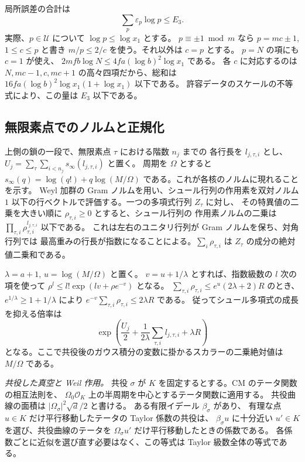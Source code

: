 局所誤差の合計は
\begin{equation}\label{eq:upper-error-sum}
  \sum_p \varepsilon_p\log p\le E_3.
\end{equation}
実際、\(p\in\mathcal U\) について \(\log p\le\log x_1\) とする。
\(p\equiv\pm1\bmod m\) なら \(p=mc\pm1\), \(1\le c\le p\) と書き
\(m/p\le2/c\) を使う。それ以外は \(c=p\) とする。
\(p=N\) の項にも \(c=1\) が使え、
\(2mfb\log N\le4fa(\log b)^2\log x_1\) である。
各 \(c\) に対応するのは \(N,mc-1,c,mc+1\) の高々四項だから、総和は
\(16fa(\log b)^2\log x_1(1+\log x_1)\) 以下である。
許容データのスケールの不等式により、この量は \(E_3\) 以下である。

\subsection{無限素点でのノルムと正規化}

上側の鎖の一段で、無限素点 \(\tau\) における階数 \(n_j\) までの
各行長を \(l_{j,\tau,i}\) とし、
\(U_j=\sum_{\tau}\sum_{i<n_j}s_\infty(l_{j,\tau,i})\) と置く。
周期を \(\Omega\) とすると \(s_\infty(q)=\log(q!)+q\log(M/\Omega)\)
である。これが各核のノルムに現れることを示す。
Weyl 加群の Gram ノルムを用い、シュール行列の作用素を双対ノルム
\(1\) 以下の行ベクトルで評価する。一つの多項式行列 \(Z_\tau\) に対し、
その特異値の二乗を大きい順に \(\rho_{\tau,i}\ge0\) とすると、シュール行列の
作用素ノルムの二乗は \(\prod_{\tau,i}\rho_{\tau,i}^{l_{j,\tau,i}}\) 以下である。
これは左右のユニタリ行列が Gram ノルムを保ち、対角行列では
最高重みの行長が指数になることによる。\(\sum_i\rho_{\tau,i}\) は
\(Z_\tau\) の成分の絶対値二乗和である。

\(\lambda=a+1\), \(u=\log(M/\Omega)\) と置く。
\(v=u+1/\lambda\) とすれば、指数級数の \(l\) 次の項を使って
\(\rho^l\le l!\exp(lv+\rho e^{-v})\) となる。
\(\sum_{\tau,i}\rho_{\tau,i}\le e^u(2\lambda+2)R\) のとき、
\(e^{1/\lambda}\ge1+1/\lambda\) により
\(e^{-v}\sum_{\tau,i}\rho_{\tau,i}\le2\lambda R\) である。
従ってシュール多項式の成長を抑える倍率は
\[
 \exp\!\left(\frac{U_j}{2}
       +\frac1{2\lambda}\sum_{\tau,i}l_{j,\tau,i}+\lambda R\right)
\]
となる。ここで共役後のガウス積分の変数に掛かるスカラーの二乗絶対値は
\(M/\Omega\) である。

\emph{共役した真空と Weil 作用。}
共役 \(\sigma\) が \(K\) を固定するとする。CM のテータ関数の相互法則を、
\(\Omega_0\mathcal O_K\) 上の半周期を中心とするテータ関数に適用する。
共役曲線の面積は \(|\Omega_\sigma|^2\sqrt d/2\) と書ける。
ある有限イデール \(\beta_\sigma\) があり、
有理な点 \(u\in K\) だけ平行移動したテータの Taylor 係数の共役は、
\(\beta_\sigma u\) に十分近い \(u'\in K\) を選び、共役曲線のテータを
\(\Omega_\sigma u'\) だけ平行移動したときの係数である。
各係数ごとに近似を選び直す必要はなく、この等式は Taylor 級数全体の等式である。

